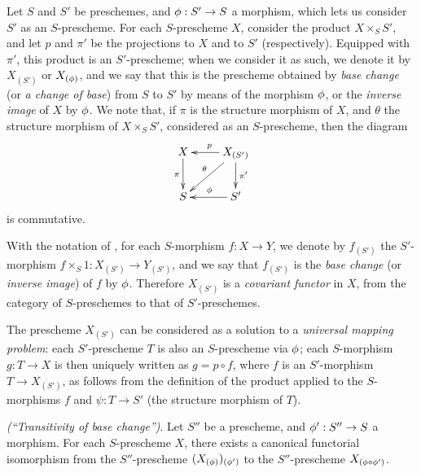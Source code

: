 \begin{env}[3.3.6]
\label{I.3.3.6}
Let $S$ and $S'$ be preschemes, and $\vphi:S'\to S$ a morphism, which lets us consider $S'$ as an
$S$-prescheme. For each $S$-prescheme $X$, consider the product $X\times_S S'$,
and let $p$ and $\pi'$ be the projections to $X$ and to $S'$ (respectively). Equipped
with $\pi'$, this product is an $S'$-prescheme; when we consider it as such, we
denote it by $X_{(S')}$ or $X_{(\phi)}$, and we say that this is the prescheme
obtained by \emph{base change} (or \emph{a change of base}) from $S$ to $S'$ by means of the morphism
$\phi$, or the \emph{inverse image} of $X$ by $\phi$. We note that, if $\pi$ is
the structure morphism of $X$, and $\theta$ the structure morphism of
$X\times_S S'$, considered as an $S$-prescheme, then the diagram
\[
  \xymatrix{
    X\ar[d]_\pi &
    X_{(S')}\ar[l]_p\ar[ld]_\theta\ar[d]^{\pi'}\\
    S &
    S'\ar[l]_\vphi
  }
\]
is commutative.
\end{env}

\begin{env}[3.3.7]
\label{I.3.3.7}
With the notation of , for each $S$-morphism $f:X\to Y$, we
denote by $f_{(S')}$ the $S'$-morphism $f\times_S 1:X_{(S')}\to Y_{(S')}$, and
we say that $f_{(S')}$ is the \emph{base change} (or \emph{inverse image}) of
$f$ by $\phi$. Therefore $X_{(S')}$ is a \emph{covariant functor} in $X$, from
the category of $S$-preschemes to that of $S'$-preschemes.
\end{env}

\begin{env}[3.3.8]
\label{I.3.3.8}
The prescheme $X_{(S')}$ can be considered as a solution to a \emph{universal
mapping problem}: each $S'$-prescheme $T$ is also an $S$-prescheme via $\phi$;
each $S$-morphism $g:T\to X$ is then uniquely written as $g=p\circ f$, where $f$
is an $S'$-morphism $T\to X_{(S')}$, as follows from the definition of the
product applied to the $S$-morphisms $f$ and $\psi:T\to S'$ (the structure
morphism of $T$).
\end{env}

\begin{proposition}[3.3.9]
\label{I.3.3.9}
\emph{(``Transitivity of base change'')}. Let $S''$ be a prescheme, and
$\vphi':S''\to S$ a morphism. For each $S$-prescheme $X$, there exists a
canonical functorial isomorphism from the $S''$-prescheme
$(X_{(\phi)})_{(\phi')}$ to the $S''$-prescheme $X_{(\phi\circ\phi')}$.
\end{proposition}

